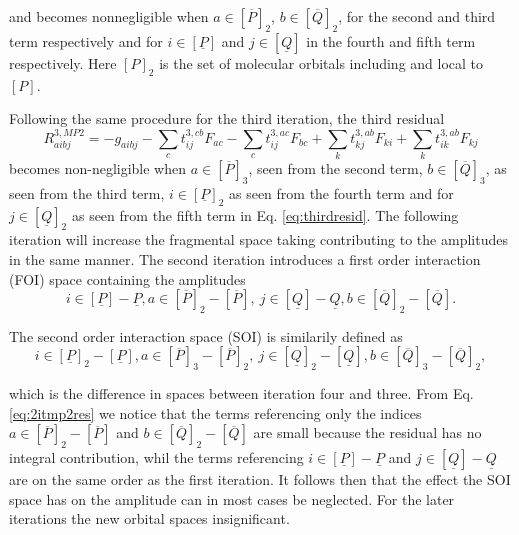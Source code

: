 \documentclass[12pt,a4paper,english]{article}
\begin{document}
and becomes nonnegligible when $a\in[\overline{P}]_2$, $b\in[\overline{Q}]_2$, for
the second and third term respectively and for $i\in[\underline{P}]$ and $j\in[\underline{Q}]$ in the fourth and fifth term respectively.
Here $[P]_2$ is the set of molecular orbitals including and local to $[P]$. 

Following the same procedure for the third iteration, the third residual
\begin{equation}
  R^{3,MP2}_{aibj}=-g_{aibj}-\sum_{c}t^{3,cb}_{ij}F_{ac}-\sum_{c}t^{3,ac}_{ij}F_{bc}+\sum_{k}t^{3,ab}_{kj}F_{ki}+\sum_{k}t^{3,ab}_{ik}F_{kj}
  \label{eq:thirdresid}
\end{equation}
becomes non-negligible when $a\in[\overline P]_3$, seen from the second term, $b\in[\overline Q]_3$, as seen from the third term, $i\in[\underline{P}]_2$ as seen from the fourth term and for $j\in [\underline{Q}]_2$ as seen from the fifth term in Eq. \eqref{eq:thirdresid}.
The following iteration will increase the fragmental space taking contributing 
to the amplitudes in the same manner.
The second iteration introduces a first order interaction (FOI) space containing
the amplitudes
\begin{equation}
  i\in[\underline{P}]-\underline{P},a\in[\overline{P}]_2-[\overline{P}],~j\in[\underline{Q}]-\underline Q,b\in[\overline{Q}]_2-[\overline{Q}].
  \label{eq:FOI}
\end{equation}

The second order interaction space (SOI) is similarily defined as
\begin{equation}
  i\in[\underline{P}]_2-[\underline{P}],a\in[\overline{P}]_3-[\overline{P}]_2,~j\in[\underline{Q}]_2-[\underline{Q}],b\in[\overline{Q}]_3-[\overline{Q}]_2,
  \label{eq:SOI}
\end{equation}

which is the difference in spaces between iteration four and three.
From Eq. \eqref{eq:2itmp2res} we notice that the terms referencing only the indices $a\in[\overline{P}]_2-[\overline{P}]$ and $b\in[\overline{Q}]_2-[\overline{Q}]$ are small because the residual has no integral contribution, whil the terms referencing $i\in[\underline{P}]-\underline{P}$ and $j\in[\underline{Q}]-\underline{Q}$ are on the same order as the first iteration. 
It follows then that the effect the SOI space has on the amplitude can in most cases be neglected. For the later iterations the new orbital spaces insignificant.








\end{document}
